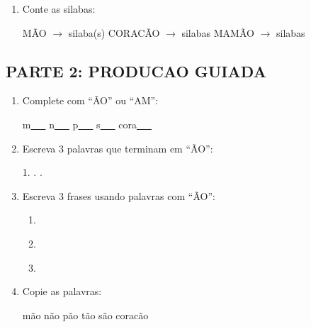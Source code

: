 \begin{exercicio}
\begin{enumerate}
  \item Conte as silabas:
  \begin{center}
  M\~AO $\rightarrow$ \underline{\hspace{1cm}} silaba(s) \quad CORAC\~AO $\rightarrow$ \underline{\hspace{1cm}} silabas \quad MAM\~AO $\rightarrow$ \underline{\hspace{1cm}} silabas
  \end{center}
\end{enumerate}

\subsection*{PARTE 2: PRODUCAO GUIADA}

\begin{enumerate}[resume]
  \item Complete com ``\~AO'' ou ``AM'':
  \begin{center}
  m\underline{~~~} \quad n\underline{~~~} \quad p\underline{~~~} \quad s\underline{~~~} \quad cora\underline{~~~}
  \end{center}

  \item Escreva 3 palavras que terminam em ``\~AO'':
  \begin{center}
  1. \underline{\hspace{3cm}} . \underline{\hspace{3cm}} . \underline{\hspace{3cm}}
  \end{center}

  \item Escreva 3 frases usando palavras com ``\~AO'':
  \begin{enumerate}[label=\alph*)]
    \item \underline{\hspace{8cm}}
    \item \underline{\hspace{8cm}}
    \item \underline{\hspace{8cm}}
  \end{enumerate}

  \item Copie as palavras:
  \begin{center}
  m\~ao \quad n\~ao \quad p\~ao \quad t\~ao \quad s\~ao \quad corac\~ao
  \end{center}


\end{enumerate}
\end{exercicio}
